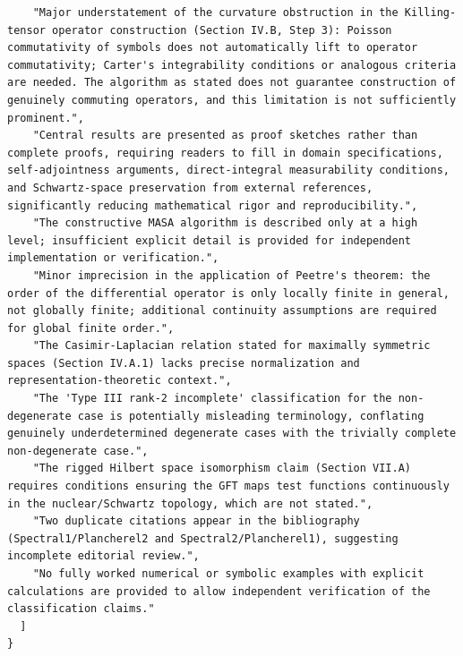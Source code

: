 \documentclass[11pt]{article}
\begin{document}
\begin{verbatim}
    "Major understatement of the curvature obstruction in the Killing-tensor operator construction (Section IV.B, Step 3): Poisson commutativity of symbols does not automatically lift to operator commutativity; Carter's integrability conditions or analogous criteria are needed. The algorithm as stated does not guarantee construction of genuinely commuting operators, and this limitation is not sufficiently prominent.",
    "Central results are presented as proof sketches rather than complete proofs, requiring readers to fill in domain specifications, self-adjointness arguments, direct-integral measurability conditions, and Schwartz-space preservation from external references, significantly reducing mathematical rigor and reproducibility.",
    "The constructive MASA algorithm is described only at a high level; insufficient explicit detail is provided for independent implementation or verification.",
    "Minor imprecision in the application of Peetre's theorem: the order of the differential operator is only locally finite in general, not globally finite; additional continuity assumptions are required for global finite order.",
    "The Casimir-Laplacian relation stated for maximally symmetric spaces (Section IV.A.1) lacks precise normalization and representation-theoretic context.",
    "The 'Type III rank-2 incomplete' classification for the non-degenerate case is potentially misleading terminology, conflating genuinely underdetermined degenerate cases with the trivially complete non-degenerate case.",
    "The rigged Hilbert space isomorphism claim (Section VII.A) requires conditions ensuring the GFT maps test functions continuously in the nuclear/Schwartz topology, which are not stated.",
    "Two duplicate citations appear in the bibliography (Spectral1/Plancherel2 and Spectral2/Plancherel1), suggesting incomplete editorial review.",
    "No fully worked numerical or symbolic examples with explicit calculations are provided to allow independent verification of the classification claims."
  ]
}
\end{verbatim}
\end{document}
